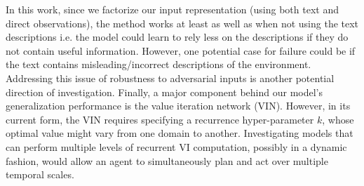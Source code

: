 In this work, since we factorize our input representation (using both text and direct observations), the method works at least as well as when not using the text descriptions i.e. the model could learn to rely less on the descriptions if they do not contain useful information. However, one potential case for failure could be if the text contains misleading/incorrect descriptions of the environment. Addressing this issue of robustness to adversarial inputs is another potential direction of investigation.
Finally, a major component behind our model's generalization performance is the value iteration network (VIN). However, in its current form, the VIN requires specifying a recurrence hyper-parameter $k$, whose optimal value might vary from one domain to another. Investigating models that can perform multiple levels of recurrent VI computation, possibly in a dynamic fashion, would allow an agent to simultaneously plan and act over multiple temporal scales.


